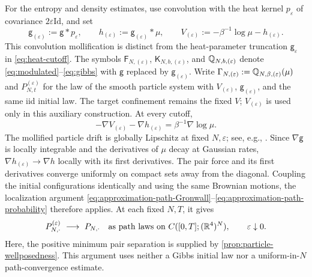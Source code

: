 \documentclass[11pt,reqno]{amsart}
\numberwithin{equation}{section}
\theoremstyle{plain}
\theoremstyle{remark}
\newcommand{\K}{\mathsf K}\newcommand{\g}{\mathsf g}\newcommand{\Fr}{\mathsf F}
\newcommand{\Id}{\mathrm{Id}}
\begin{document}
For the entropy and density estimates, use convolution with the heat kernel $p_\varepsilon$ of covariance $2\varepsilon\Id$, and set
\begin{equation}\label{iid:eq:regularization}
 \g_{(\varepsilon)}:=\g*p_\varepsilon,\qquad
 h_{(\varepsilon)}:=\g_{(\varepsilon)}*\mu,\qquad
 V_{(\varepsilon)}:=-\beta^{-1}\log\mu-h_{(\varepsilon)}.
\end{equation}
This convolution mollification is distinct from the heat-parameter truncation $\g_\varepsilon$ in \eqref{eq:heat-cutoff}. The symbols $\Fr_{N,(\varepsilon)}$, $\K_{N,b,(\varepsilon)}$, and $\mathbb Q_{N,b,(\varepsilon)}$ denote \eqref{eq:modulated}--\eqref{eq:gibbs} with $\g$ replaced by $\g_{(\varepsilon)}$. Write $\Gamma_{N,(\varepsilon)}:=\mathbb Q_{N,\beta,(\varepsilon)}(\mu)$ and $P_{N,t}^{(\varepsilon)}$ for the law of the smooth particle system with $V_{(\varepsilon)}$, $\g_{(\varepsilon)}$, and the same iid initial law. The target confinement remains the fixed $V$; $V_{(\varepsilon)}$ is used only in this auxiliary construction. At every cutoff,
\begin{equation}\label{iid:eq:compensated-drift}
 -\nabla V_{(\varepsilon)}-\nabla h_{(\varepsilon)}
 =\beta^{-1}\nabla\log\mu.
\end{equation}
The mollified particle drift is globally Lipschitz at fixed $N,\varepsilon$; see, e.g., \cite[Section 5.2]{Oksendal}. Since $\nabla\g$ is locally integrable and the derivatives of $\mu$ decay at Gaussian rates, $\nabla h_{(\varepsilon)}\to\nabla h$ locally with its first derivatives. The pair force and its first derivatives converge uniformly on compact sets away from the diagonal. Coupling the initial configurations identically and using the same Brownian motions, the localization argument \eqref{eq:approximation-path-Gronwall}--\eqref{eq:approximation-path-probability} therefore applies. At each fixed $N,T$, it gives
\begin{equation}\label{iid:eq:path-convergence}
 P_{N,\cdot}^{(\varepsilon)}\ \longrightarrow\ P_{N,\cdot}
 \quad\text{as path laws on }C([0,T];(\mathbb R^4)^N),\qquad\varepsilon\downarrow0.
\end{equation}
Here, the positive minimum pair separation is supplied by \cref{prop:particle-wellposedness}. This argument uses neither a Gibbs initial law nor a uniform-in-$N$ path-convergence estimate.
\end{document}
